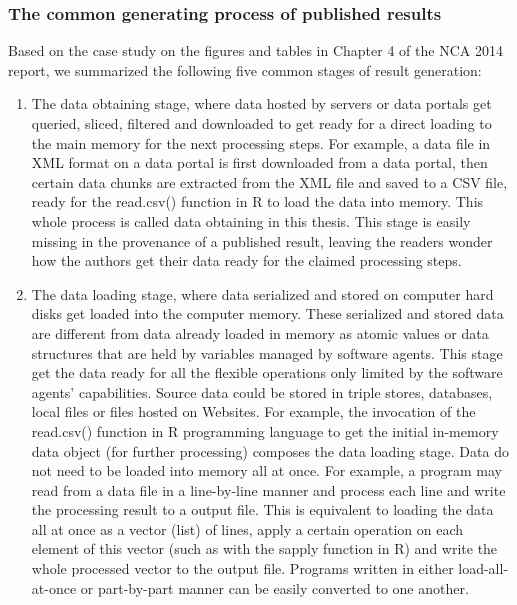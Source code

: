 \subsubsection{The common generating process of published results}
Based on the case study on the figures and tables in Chapter 4 of the NCA 2014 report, we summarized the following five common stages of result generation:
\begin{enumerate}
	\item The data obtaining stage, where data hosted by servers or data portals get queried, sliced, filtered and downloaded to get ready for a direct loading to the main memory for the next processing steps. For example, a data file in XML format on a data portal is first downloaded from a data portal, then certain data chunks are extracted from the XML file and saved to a CSV file, ready for the read.csv() function in R to load the data into memory. This whole process is called data obtaining in this thesis. This stage is easily missing in the provenance of a published result, leaving the readers wonder how the authors get their data ready for the claimed processing steps.
	\item The data loading stage, where data serialized and stored on computer hard disks get loaded into the computer memory. These serialized and stored data are different from data already loaded in memory as atomic values or data structures that are held by variables managed by software agents. This stage get the data ready for all the flexible operations only limited by the software agents' capabilities. Source data could be stored in triple stores, databases, local files or files hosted on Websites. For example, the invocation of the read.csv() function in R programming language to get the initial in-memory data object (for further processing) composes the data loading stage. Data do not need to be loaded into memory all at once. For example, a program may read from a data file in a line-by-line manner and process each line and write the processing result to a output file. This is equivalent to loading the data all at once as a vector (list) of lines, apply a certain operation on each element of this vector (such as with the sapply function in R) and write the whole processed vector to the output file. Programs written in either load-all-at-once or part-by-part manner can be easily converted to one another.

\end{enumerate}
